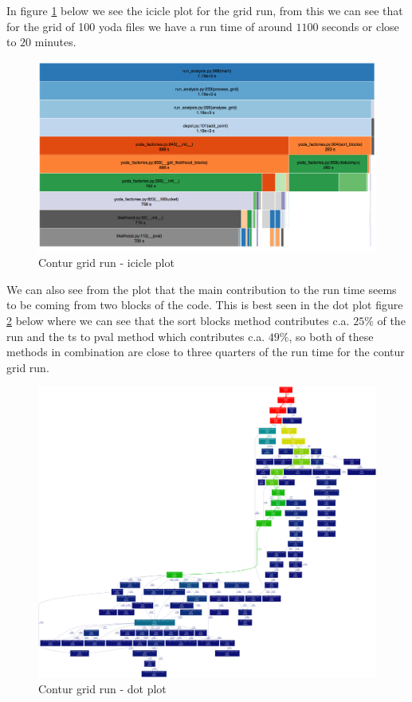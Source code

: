 In figure \ref{fig:grid_yoda_start_profile} below we see the icicle plot for the grid run, from this we can see that for the grid of 100 yoda files we have a run time of around $1100$ seconds or close to $20$ minutes. 
\begin{figure}[H]
\centering
\includegraphics[scale=0.30]{plots/initial_contur_grid_profile_two.png}
\caption{Contur grid run - icicle plot}
\label{fig:grid_yoda_start_profile}
\end{figure}

We can also see from the plot that the main contribution to the run time seems to be coming from two blocks of the code. This is best seen in the dot plot figure \ref{fig:grid_yoda_start_profile_dot} below where we can see that the sort blocks method contributes c.a. $25\%$ of the run and the ts to pval method which contributes c.a. $49\%$, so both of these methods in combination are close to three quarters of the run time for the contur grid run.


\begin{figure}[H]
\centering
\includegraphics[scale=0.1]{plots/initial_contur_grid_two.png}
\caption{Contur grid run - dot plot}
\label{fig:grid_yoda_start_profile_dot}
\end{figure}




